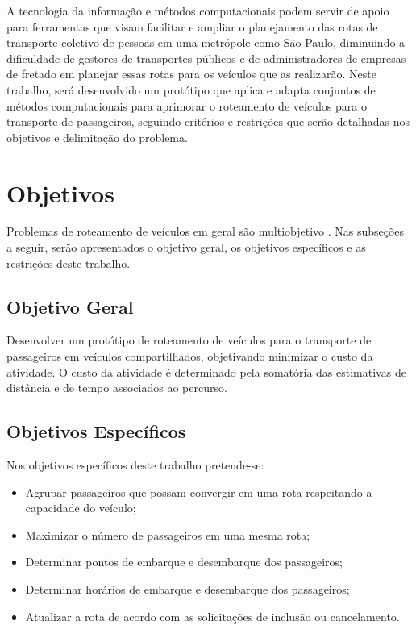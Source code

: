A tecnologia da informação e métodos computacionais podem servir de apoio para ferramentas que visam facilitar e ampliar o planejamento das rotas de transporte coletivo de pessoas em uma metrópole como São Paulo, diminuindo a dificuldade de gestores de transportes públicos e de administradores de empresas de fretado em planejar essas rotas para os veículos que as realizarão. Neste trabalho, será desenvolvido um protótipo que aplica e adapta conjuntos de métodos computacionais para aprimorar o roteamento de veículos para o transporte de passageiros, seguindo critérios e restrições que serão detalhadas nos objetivos e delimitação do problema.

\section{Objetivos}

Problemas de roteamento de veículos em geral são multiobjetivo \cite[p. 279]{goldbarg}.
Nas subseções a seguir, serão apresentados o objetivo geral, os objetivos específicos e as restrições deste trabalho. 

\subsection{Objetivo Geral}

Desenvolver um protótipo de roteamento de veículos para o transporte de passageiros em veículos compartilhados, objetivando minimizar o custo da atividade. O custo da atividade é determinado pela somatória das estimativas de distância e de tempo associados ao percurso. 

\subsection{Objetivos Específicos}
Nos objetivos específicos deste trabalho pretende-se:
\begin{itemize}
    
    \item Agrupar passageiros que possam convergir em uma rota respeitando a capacidade do veículo;
    
    \item Maximizar o número de passageiros em uma mesma rota;
    
    \item Determinar pontos de embarque e desembarque dos passageiros;
    
    \item Determinar horários de embarque e desembarque dos passageiros;
    
    \item Atualizar a rota de acordo com as solicitações de inclusão ou cancelamento.
    
\end{itemize}

